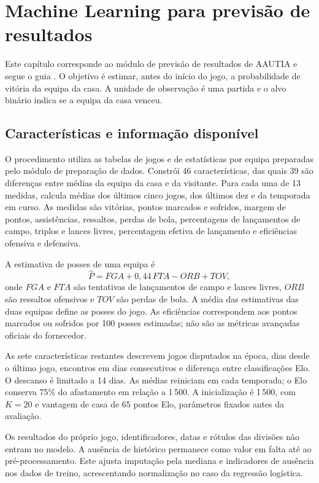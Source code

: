 \chapter{Machine Learning para previsão de resultados}
\label{chap:previsao-resultados}

Este capítulo corresponde ao módulo de previsão de resultados de AAUTIA e segue o guia
. O objetivo é estimar, antes do início
do jogo, a probabilidade de vitória da equipa da casa. A unidade de
observação é uma partida e o alvo binário indica se a equipa da casa venceu.

\section{Características e informação disponível}

O procedimento utiliza as tabelas de jogos e de estatísticas por equipa
preparadas pelo módulo de preparação de dados. Constrói 46 características, das quais 39 são
diferenças entre médias da equipa da casa e da visitante. Para cada uma
de 13 medidas, calcula médias dos últimos cinco jogos, dos últimos dez
e da temporada em curso. As medidas são vitórias, pontos marcados e
sofridos, margem de pontos, assistências, ressaltos, perdas de bola,
percentagens de lançamentos de campo, triplos e lances livres,
percentagem efetiva de lançamento e eficiências ofensiva e defensiva.

A estimativa de posses de uma equipa é
\[
\widehat{P}=FGA+0{,}44\,FTA-ORB+TOV,
\]
onde \(FGA\) e \(FTA\) são tentativas de lançamentos de campo e lances
livres, \(ORB\) são ressaltos ofensivos e \(TOV\) são perdas de bola.
A média das estimativas das duas equipas define as posses do jogo.
As eficiências correspondem aos pontos marcados ou sofridos por 100
posses estimadas; não são as métricas avançadas oficiais do fornecedor.

As sete características restantes descrevem jogos disputados na época,
dias desde o último jogo, encontros em dias consecutivos e diferença
entre classificações Elo. O descanso é limitado a 14 dias. As médias
reiniciam em cada temporada; o Elo conserva 75\% do afastamento em relação
a 1\,500. A inicialização é 1\,500, com \(K=20\) e vantagem de casa de 65
pontos Elo, parâmetros fixados antes da avaliação.

Os resultados do próprio jogo, identificadores, datas e rótulos das
divisões não entram no modelo. A ausência de histórico permanece como
valor em falta até ao pré-processamento. Este ajusta imputação pela
mediana e indicadores de ausência nos dados de treino, acrescentando
normalização no caso da regressão logística.


